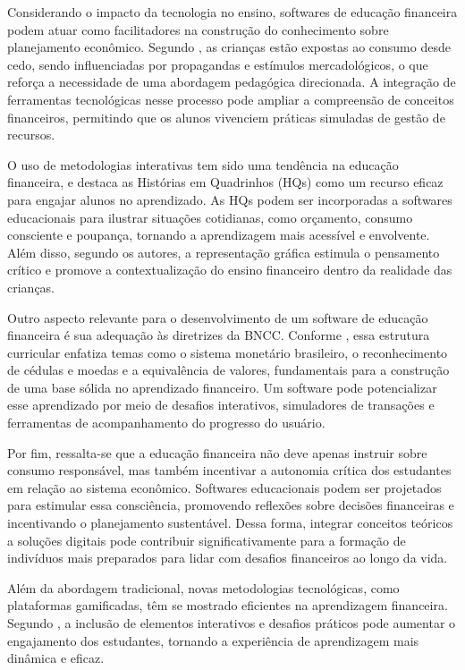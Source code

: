 \documentclass[
	article,			%
	12pt,				%
	oneside,			%
	a4paper,			%
	english,			%
	brazil,				%
	sumario=tradicional
	]{abntex2}
\begin{document}
    Considerando o impacto da tecnologia no ensino, softwares de educação financeira podem atuar como facilitadores na construção do conhecimento sobre planejamento econômico. Segundo , as crianças estão expostas ao consumo desde cedo, sendo influenciadas por propagandas e estímulos mercadológicos, o que reforça a necessidade de uma abordagem pedagógica direcionada. A integração de ferramentas tecnológicas nesse processo pode ampliar a compreensão de conceitos financeiros, permitindo que os alunos vivenciem práticas simuladas de gestão de recursos.

    O uso de metodologias interativas tem sido uma tendência na educação financeira, e  destaca as Histórias em Quadrinhos (HQs) como um recurso eficaz para engajar alunos no aprendizado. As HQs podem ser incorporadas a softwares educacionais para ilustrar situações cotidianas, como orçamento, consumo consciente e poupança, tornando a aprendizagem mais acessível e envolvente. Além disso, segundo os autores, a representação gráfica estimula o pensamento crítico e promove a contextualização do ensino financeiro dentro da realidade das crianças.

    Outro aspecto relevante para o desenvolvimento de um software de educação financeira é sua adequação às diretrizes da BNCC. Conforme , essa estrutura curricular enfatiza temas como o sistema monetário brasileiro, o reconhecimento de cédulas e moedas e a equivalência de valores, fundamentais para a construção de uma base sólida no aprendizado financeiro. Um software pode potencializar esse aprendizado por meio de desafios interativos, simuladores de transações e ferramentas de acompanhamento do progresso do usuário.

    Por fim, ressalta-se que a educação financeira não deve apenas instruir sobre consumo responsável, mas também incentivar a autonomia crítica dos estudantes em relação ao sistema econômico. Softwares educacionais podem ser projetados para estimular essa consciência, promovendo reflexões sobre decisões financeiras e incentivando o planejamento sustentável. Dessa forma, integrar conceitos teóricos a soluções digitais pode contribuir significativamente para a formação de indivíduos mais preparados para lidar com desafios financeiros ao longo da vida.

    Além da abordagem tradicional, novas metodologias tecnológicas, como plataformas gamificadas, têm se mostrado eficientes na aprendizagem financeira. Segundo , a inclusão de elementos interativos e desafios práticos pode aumentar o engajamento dos estudantes, tornando a experiência de aprendizagem mais dinâmica e eficaz.
\end{document}

